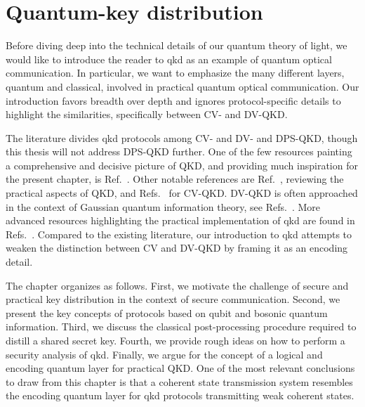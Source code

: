 \chapter{Quantum-key distribution}\label{ch:qkd}

Before diving deep into the technical details of our quantum theory of light, we would like to introduce the reader to \gls{qkd} as an example of quantum optical communication.
In particular, we want to emphasize the many different layers, quantum and classical, involved in practical quantum optical communication.
Our introduction favors breadth over depth and ignores protocol-specific details to highlight the similarities, specifically between CV- and DV-QKD.

The literature divides \gls{qkd} protocols among CV- and DV- and DPS-QKD, though this thesis will not address DPS-QKD further.
One of the few resources painting a comprehensive and decisive picture of QKD, and providing much inspiration for the present chapter, is Ref.~\cite{Wolf2021}.
Other notable references are Ref.~\cite{Diamanti2016}, reviewing the practical aspects of QKD, and Refs.~\cite{Duvsek2006,Gisin2002} for CV-QKD.
DV-QKD is often approached in the context of Gaussian quantum information theory, see Refs.~\cite{Weedbrook2012,Ferraro2005}.
More advanced resources highlighting the practical implementation of \gls{qkd} are found in Refs.~\cite{Scarani2009,Fung2010,Laudenbach2018}.
Compared to the existing literature, our introduction to \gls{qkd} attempts to weaken the distinction between CV and DV-QKD by framing it as an encoding detail.

The chapter organizes as follows. 
First, we motivate the challenge of secure and practical key distribution in the context of secure communication.
Second, we present the key concepts of protocols based on qubit and bosonic quantum information.
Third, we discuss the classical post-processing procedure required to distill a shared secret key.
Fourth, we provide rough ideas on how to perform a security analysis of \gls{qkd}.
Finally, we argue for the concept of a logical and encoding quantum layer for practical QKD.
One of the most relevant conclusions to draw from this chapter is that a coherent state transmission system resembles the encoding quantum layer for \gls{qkd} protocols transmitting weak coherent states.